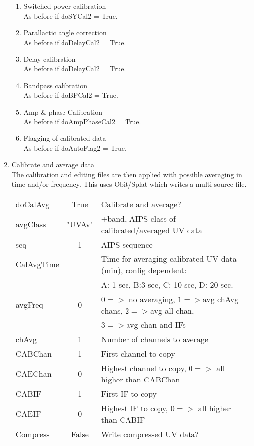 \documentclass[11pt]{article}
\begin{document}
\begin{enumerate}
\begin{enumerate}
\item Switched power calibration\\
As before if doSYCal2 = True.
\item Parallactic angle correction\\
As before if doDelayCal2 = True.
\item Delay calibration\\
As before if doDelayCal2 = True.
\item Bandpass calibration\\
As before if doBPCal2 = True.
\item Amp \& phase Calibration \\
As before if doAmpPhaseCal2 = True.
\item Flagging of calibrated data\\
As before if doAutoFlag2 = True.
\end{enumerate}
\item Calibrate and average data\\
The calibration and editing files are then applied with possible
averaging in time and/or frequency.
This uses Obit/Splat which writes a multi-source file.
\begin{center}
\begin{tabular}{|l|c|l|}
\hline
doCalAvg  & True &  Calibrate and average?\\
avgClass  & "UVAv" & +band, AIPS class of calibrated/averaged UV data \\
seq  & 1 &  AIPS sequence \\
CalAvgTime  &  &  Time for averaging calibrated UV data (min), config
dependent: \\
 & & A: 1 sec, B:3 sec, C: 10 sec, D: 20 sec. \\
avgFreq  & 0 &  $0=>$ no averaging, $1=>$avg chAvg chans, $2=>$avg all
chan, \\
 & &$3=>$avg chan and IFs\\
chAvg  & 1 & Number of channels to average \\
CABChan& 1 &  First channel to copy \\
CAEChan& 0 &  Highest channel to copy, $0=>$ all higher than CABChan\\
CABIF  & 1 &  First IF to copy \\
CAEIF  & 0 &  Highest IF to copy, $0=>$ all higher than CABIF\\
Compress & False &  Write compressed UV data?\\
\hline

\end{tabular}
\end{center}
\end{enumerate}
\end{document}
